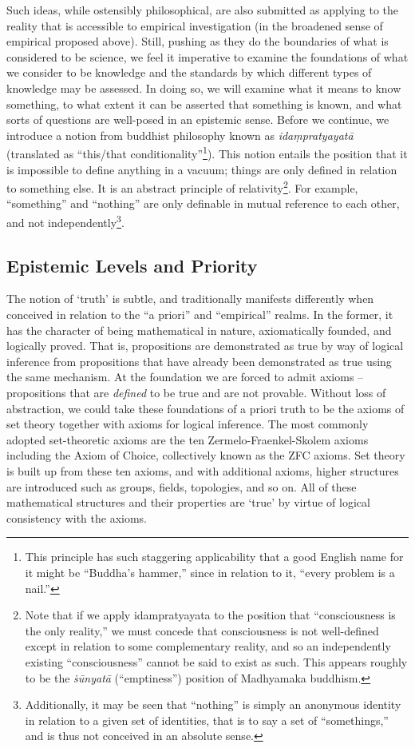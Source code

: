 \documentclass[pra,twocolumn,groupedaddress,10pt]{revtex4}
\theoremstyle{definition}
\begin{document}
Such ideas, while ostensibly philosophical, are also submitted as applying to the reality that is accessible to empirical investigation (in the broadened sense of empirical proposed above). Still, pushing as they do the boundaries of what is considered to be science, we feel it imperative to examine the foundations of what we consider to be knowledge and the standards by which different types of knowledge may be assessed. In doing so, we will examine what it means to know something, to what extent it can be asserted that something is known, and what sorts of questions are well-posed in an epistemic sense. Before we continue, we introduce a notion from buddhist philosophy known as \emph{ida\d{m}pratyayat\={a}} (translated as ``this/that conditionality''\footnote{This principle has such staggering applicability that a good English name for it might be ``Buddha's hammer,'' since in relation to it, ``every problem is a nail.''}). This notion entails the position that it is impossible to define anything in a vacuum; things are only defined in relation to something else. It is an abstract principle of relativity\footnote{Note that if we apply idampratyayata to the position that ``consciousness is the only reality,'' we must concede that consciousness is not well-defined except in relation to some complementary reality, and so an independently existing ``consciousness'' cannot be said to exist as such. This appears roughly to be the \emph{\.{s}\={u}nyat\={a}} (``emptiness'') position of Madhyamaka buddhism.}. For example, ``something'' and ``nothing'' are only definable in mutual reference to each other, and not independently\footnote{Additionally, it may be seen that ``nothing'' is simply an anonymous identity in relation to a given set of identities, that is to say a set of ``somethings,'' and is thus not conceived in an absolute sense.}.

\subsection{Epistemic Levels and Priority} \label{sec:epipri}

The notion of `truth' is subtle, and traditionally manifests differently when conceived in relation to the ``a priori'' and ``empirical'' realms. In the former, it has the character of being mathematical in nature, axiomatically founded, and logically proved. That is, propositions are demonstrated as true by way of logical inference from propositions that have already been demonstrated as true using the same mechanism. At the foundation we are forced to admit axioms -- propositions that are \emph{defined} to be true and are not provable. Without loss of abstraction, we could take these foundations of a priori truth to be the axioms of set theory together with axioms for logical inference. The most commonly adopted set-theoretic axioms are the ten Zermelo-Fraenkel-Skolem axioms including the Axiom of Choice, collectively known as the ZFC axioms. Set theory is built up from these ten axioms, and with additional axioms, higher structures are introduced such as groups, fields, topologies, and so on. All of these mathematical structures and their properties are `true' by virtue of logical consistency with the axioms.
\end{document}
